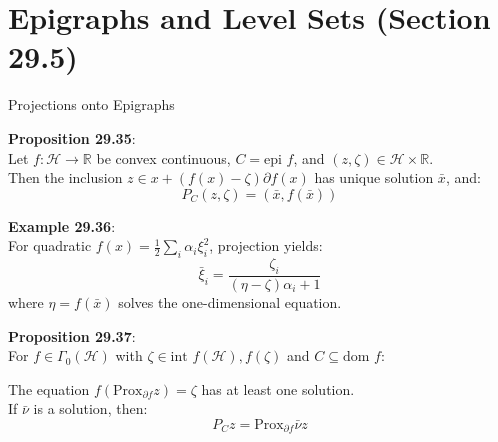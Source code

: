 \documentclass[aspectratio=169,10pt]{beamer}
\begin{document}
\section{Epigraphs and Level Sets (Section 29.5)}

\begin{frame}[allowframebreaks]{Projections onto Epigraphs}

    \textbf{Proposition 29.35}:\\
    Let $f: \mathcal{H} \to \mathbb{R}$ be convex continuous, $C = \text{epi } f$, and $(z, \zeta) \in \mathcal{H} \times \mathbb{R}$.\\
    Then the inclusion $z \in x + (f(x) - \zeta)\partial f(x)$ has unique solution $\bar{x}$, and:
    $$P_C(z, \zeta) = (\bar{x}, f(\bar{x}))$$

    \vspace{0.5cm}

    \textbf{Example 29.36}:\\
    For quadratic $f(x) = \frac{1}{2}\sum_i \alpha_i \xi_i^2$, projection yields:
    $$\bar{\xi}_i = \frac{\zeta_i}{(\eta - \zeta)\alpha_i + 1}$$
    where $\eta = f(\bar{x})$ solves the one-dimensional equation.

    \framebreak

    \textbf{Proposition 29.37}:\\
    For $f \in \Gamma_0(\mathcal{H})$ with $\zeta \in \text{int } f(\mathcal{H}), f(\zeta)$ and $C \subseteq \text{dom } f$:

    The equation $f(\text{Prox}_{\partial f} z) = \zeta$ has at least one solution.\\
    If $\bar{\nu}$ is a solution, then:
    $$P_C z = \text{Prox}_{\partial f} \bar{\nu} z$$

\end{frame}
\end{document}
